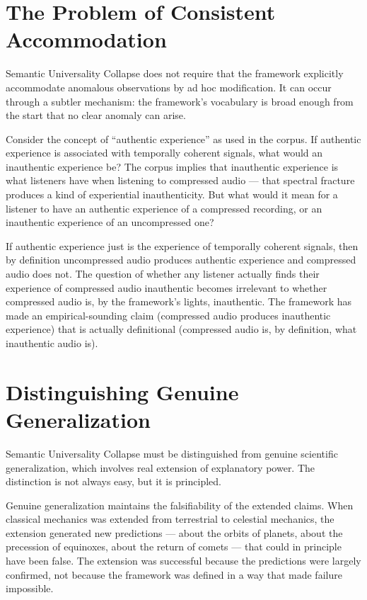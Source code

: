\section{The Problem of Consistent Accommodation}
\label{sec:consistent-accommodation}

Semantic Universality Collapse does not require that the
framework explicitly accommodate anomalous observations
by ad hoc modification. It can occur through a subtler
mechanism: the framework's vocabulary is broad enough
from the start that no clear anomaly can arise.

Consider the concept of ``authentic experience'' as used
in the corpus. If authentic experience is associated with
temporally coherent signals, what would an inauthentic
experience be? The corpus implies that inauthentic
experience is what listeners have when listening to
compressed audio --- that spectral fracture produces a
kind of experiential inauthenticity. But what would it
mean for a listener to have an authentic experience of
a compressed recording, or an inauthentic experience of
an uncompressed one?

If authentic experience just is the experience of temporally
coherent signals, then by definition uncompressed audio
produces authentic experience and compressed audio does
not. The question of whether any listener actually finds
their experience of compressed audio inauthentic becomes
irrelevant to whether compressed audio is, by the
framework's lights, inauthentic. The framework has made
an empirical-sounding claim (compressed audio produces
inauthentic experience) that is actually definitional
(compressed audio is, by definition, what inauthentic
audio is).

\section{Distinguishing Genuine Generalization}
\label{sec:genuine-generalization}

Semantic Universality Collapse must be distinguished from
genuine scientific generalization, which involves
real extension of explanatory power. The distinction
is not always easy, but it is principled.

Genuine generalization maintains the falsifiability of
the extended claims. When classical mechanics was extended
from terrestrial to celestial mechanics, the extension
generated new predictions --- about the orbits of planets,
about the precession of equinoxes, about the return of
comets --- that could in principle have been false.
The extension was successful because the predictions were
largely confirmed, not because the framework was defined
in a way that made failure impossible.


